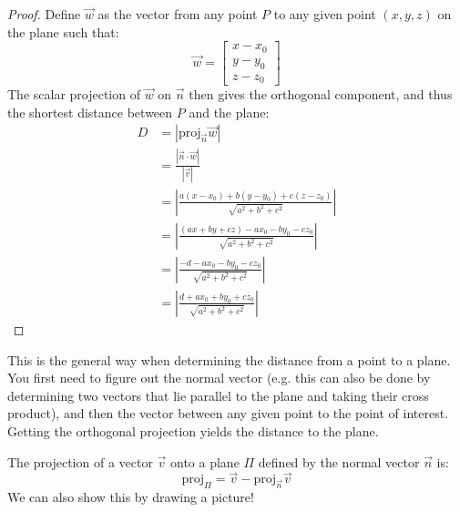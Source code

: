 \documentclass{article}
\begin{document}
\begin{idea}
\begin{proof}
        Define $\vec{w}$ as the vector from any point $P$ to any given point $(x,y,z)$ on the plane such that:
        \begin{equation}
            \vec{w} = \begin{bmatrix}
                x-x_0\\ 
                y-y_0 \\ 
                z-z_0
            \end{bmatrix}
            \label{eq:}
        \end{equation}
        The scalar projection of $\vec{w}$ on $\vec{n}$ then gives the orthogonal component, and thus the shortest distance between $P$ and the plane:
        \begin{align}
            D &= |\text{proj}_{\vec{n}}\vec{w}| \\ 
            &= \frac{|\vec{n}\cdot\vec{w}|}{|\vec{v}|} \\ 
            &=
             \left|\frac{a(x-x_0)+b(y-y_0)+c(z-z_0)}{\sqrt{a^2+b^2+c^2}}\right| \\ 
             &= \left|\frac{(ax+by+cz)-ax_0-by_0-cz_0}{\sqrt{a^2+b^2+c^2}}\right| \\ 
             &= \left|\frac{-d-ax_0-by_0-cz_0}{\sqrt{a^2+b^2+c^2}}\right| \\ 
             &= \left|\frac{d+ax_0+by_0+cz_0}{\sqrt{a^2+b^2+c^2}}\right|
        \end{align}
    \end{proof}
    This is the general way when determining the distance from a point to a plane. You first need to figure out the normal vector (e.g. this can also be done by determining two vectors that lie parallel to the plane and taking their cross product), and then the vector between any given point to the point of interest. Getting the orthogonal projection yields the distance to the plane.
\end{idea}
\begin{idea}
    The projection of a vector $\vec{v}$ onto a plane $\Pi$ defined by the normal vector $\vec{n}$ is:
    \begin{equation}
        \text{proj}_{\Pi} = \vec{v}-\text{proj}_{\vec{n}}\vec{v}
        \label{eq:}
    \end{equation}
    We can also show this by drawing a picture!
\end{idea}
\end{document}
